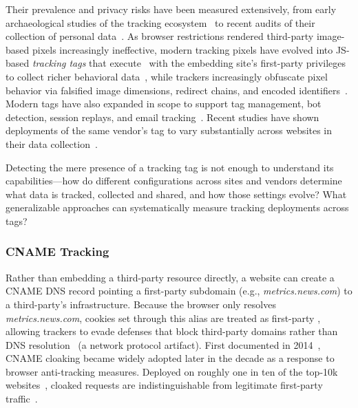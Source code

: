 Their prevalence and privacy risks have been measured extensively, from early archaeological studies of the tracking ecosystem~\cite{lernerInternetJonesRaiders2016,englehardtOnlineTracking1millionsite2016} to recent audits of their collection of personal data~\cite{huCharacterizingPixelTracking2019,bekosPIIxelLeaksPassive2025}.
%
As browser restrictions rendered third-party image-based pixels increasingly ineffective, modern tracking pixels have evolved into JS-based \textit{tracking tags} that execute \symExecution\ with the embedding site's first-party privileges to collect richer behavioral data~\cite{bekosHitchhikersGuideFacebook2023,munirCookieGraphUnderstandingDetecting2023}, while trackers increasingly obfuscate pixel behavior via falsified image dimensions, redirect chains, and encoded identifiers~\cite{huCharacterizingPixelTracking2019}.
%
Modern tags have also expanded in scope to support tag management, bot detection, session replays, and email tracking~\cite{senolLeakyFormsStudy2022,acarNoBoundariesData2020,englehardtNoBoundariesCredentials2018,englehardtNeverSignedThis2018,fouadMissedFilterLists2020}. Recent studies have shown deployments of the same vendor's tag to vary substantially across websites in their data collection~\cite{kiesermanTrackerInstallationsAre2025,bekosPIIxelLeaksPassive2025,ghaniPixelConfigLongitudinalMeasurement2026}.


\begin{opbox}
Detecting the mere presence of a tracking tag is not enough to understand its capabilities---how do different configurations across sites and vendors determine what data is tracked, collected and shared, and how those settings evolve? 
What generalizable approaches can systematically measure tracking deployments across tags?
\end{opbox}

\subsubsection{CNAME Tracking}
\label{sec:stateful-techniques-cname}
Rather than embedding a third-party resource directly, a website can create a CNAME DNS record pointing a first-party subdomain (e.g., \textit{metrics.news.com}) to a third-party's infrastructure.
%
Because the browser only resolves \textit{metrics.news.com}, cookies set through this alias are treated as first-party \symStorage, allowing trackers to evade defenses that block third-party domains rather than DNS resolution~\cite{dimovaCNAMEGameLargescale2021} (a network protocol artifact). 
%
First documented in 2014~\cite{olejnikSellingPrivacyAuction2014,olejnikBidNotBid2014}, CNAME cloaking became widely adopted later in the decade as a response to browser anti-tracking measures. Deployed on roughly one in ten of the top-10k websites~\cite{dimovaCNAMEGameLargescale2021}, cloaked requests are indistinguishable from legitimate first-party traffic~\cite{dimovaCNAMEGameLargescale2021,chenCookieSwapParty2021}.

